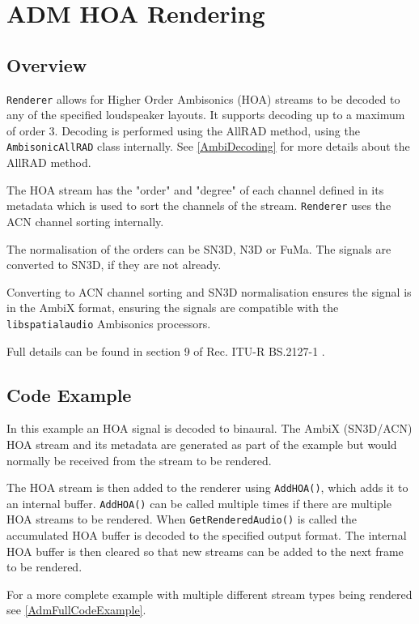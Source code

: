 \documentclass[12pt]{report}
\def\libspataud{\texttt{libspatialaudio}\xspace}
\newcommand{\code}[1]{\texttt{#1}}
\begin{document}
\section{ADM HOA Rendering}\label{AdmHOA}

\subsection{Overview}

\code{Renderer} allows for Higher Order Ambisonics (HOA) streams to be decoded to any of the specified loudspeaker layouts.
It supports decoding up to a maximum of order 3.
Decoding is performed using the AllRAD method, using the \code{AmbisonicAllRAD} class internally. See \cref{AmbiDecoding} for more details about the AllRAD method.

The HOA stream has the "order" and "degree" of each channel defined in its metadata which is used to sort the channels of the stream.
\code{Renderer} uses the ACN channel sorting internally.

The normalisation of the orders can be SN3D, N3D or FuMa.
The signals are converted to SN3D, if they are not already.

Converting to ACN channel sorting and SN3D normalisation ensures the signal is in the AmbiX format, ensuring the signals are compatible with the \libspataud Ambisonics processors.

Full details can be found in section 9 of Rec. ITU-R BS.2127-1 \cite{ITU2127}.

\subsection{Code Example}

In this example an HOA signal is decoded to binaural. The AmbiX (SN3D/ACN) HOA stream and its metadata are generated as part of the example but would normally be received from the stream to be rendered.

The HOA stream is then added to the renderer using \code{AddHOA()}, which adds it to an internal buffer. \code{AddHOA()} can be called multiple times if there are multiple HOA streams to be rendered. When \code{GetRenderedAudio()} is called the accumulated HOA buffer is decoded to the specified output format. The internal HOA buffer is then cleared so that new streams can be added to the next frame to be rendered.

For a more complete example with multiple different stream types being rendered see \cref{AdmFullCodeExample}.
\end{document}

